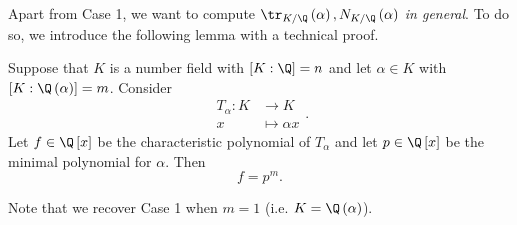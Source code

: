 \documentclass[pmath441]{subfiles}
\begin{document}
    \np Apart from Case 1, we want to compute $\tr_{K /\Q}\left( \alpha \right), N_{K /\Q}\left( \alpha \right)$ \textit{in general}. To do so, we introduce the following lemma with a technical proof.

    \begin{lemma}{}
        Suppose that $K$ is a number field with $\left[ K:\Q \right] = n$ and let $\alpha\in K$ with $\left[ K:\Q\left( \alpha \right) \right] = m$. Consider
        \begin{equation*}
            \begin{aligned}
                T_{\alpha}:K&\to K \\
                x & \mapsto \alpha x
            \end{aligned} .
        \end{equation*}
        Let $f\in\Q\left[ x \right]$ be the characteristic polynomial of $T_{\alpha}$ and let $p\in\Q\left[ x \right]$ be the minimal polynomial for $\alpha$. Then
        \begin{equation*}
            f = p^m.
        \end{equation*}
    \end{lemma}

    \np Note that we recover Case 1 when $m=1$ (i.e. $K=\Q\left( \alpha \right)$).
    
\end{document}
